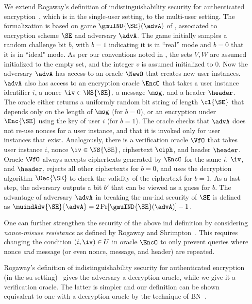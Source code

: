 
We extend Rogaway's definition of  indistinguishability security for authenticated encryption~\cite{CCS:Rogaway02}, which is in the single-user setting, to the multi-user setting. The formalization is based on game $\gmuIND{\SE}(\advA)$ of , associated to encryption scheme $\SE$ and adversary $\advA$. The game initially samples a random challenge bit $b$, with $b=1$ indicating it is in ``real'' mode and $b=0$ that it is in ``ideal" mode. As per our conventions noted in ,  the sets $V,W$ are assumed initialized to the empty set, and the integer $v$ is assumed initialized to $0$. Now the adversary $\advA$ has access to an oracle $\NewO$ that creates new user instances. $\advA$ also has access to an encryption oracle $\EncO$ that takes a user instance identifier $i$, a nonce $\iv \in \NS{\SE}$, a message $\msg$, and a header $\header$. The oracle either returns a uniformly random bit string of length $\cl{\SE}$ that depends only on the length of $\msg$ (for $b=0$), or an encryption under $\Enc{\SE}$ using the key of user $i$  (for $b=1$). The oracle checks that $\advA$ does not re-use nonces for a user instance, and that it is invoked only for user instances that exist. Analogously, there is a verification oracle $\VfO$ that takes user instance $i$, nonce $\iv \in \NS{\SE}$, ciphertext $\ciph$, and header $\header$. Oracle $\VfO$ always accepts ciphertexts generated by $\EncO$ for the same  $i$, $\iv$, and $\header$, rejects all other ciphertexts for $b=0$, and uses the decryption algorithm $\Dec{\SE}$ to check the validity of the ciphertext for $b=1$.  As a last step, the adversary outputs a bit $b'$ that can be viewed as a guess for $b$.  The advantage of adversary $\advA$ in breaking the mu-ind security of   $\SE$ is defined as $\muindAdv{\SE}{\advA} = 2\Pr[\gmuIND{\SE}(\advA)]- 1$.

One can further strengthen the security of the above ind definition by considering \emph{nonce-misuse resistance} as defined by Rogaway and Shrimpton~\cite{EC:RogShr06}. This requires changing the condition $(i,\iv)\in U$ in oracle $\EncO$ to only prevent queries where nonce \emph{and} message (or even nonce, message, and header) are repeated. 

Rogaway's definition of indistinguishability security for authenticated encryption (in the su setting)~\cite{CCS:Rogaway02} gives the adversary a decryption oracle, while we give it a verification oracle. The latter is simpler and our definition can be shown equivalent to one with a decryption oracle by the technique of BN~\cite{AC:BelNam00}.

